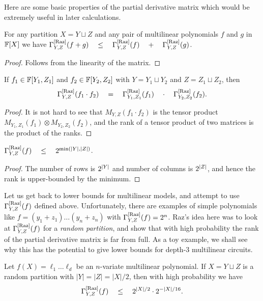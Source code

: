 Here are some basic properties of the partial derivative matrix which would be extremely useful in later calculations.

\begin{observation}\label{obs:pdm-subadditivity}
	For any partition $X = Y \sqcup Z$ and any pair of multilinear 
	polynomials $f$ and $g$ in $\mathbb{F}[X]$ we have 
$\Gamma^{\mathrm{[Raz]}}_{Y,Z}(f+g) \quad \leq \quad \Gamma^{\mathrm{[Raz]}}_{Y,Z}(f) \quad + \quad \Gamma^{\mathrm{[Raz]}}_{Y,Z}(g)$.
\end{observation}
\begin{proof}
Follows from the linearity of the matrix. 
\end{proof}

\begin{observation}[Multiplicativity]\label{obs:pdm-multiplicativity}
If $f_1 \in \mathbb{F}[Y_1,Z_1]$ and $f_2 \in \mathbb{F}[Y_2, Z_2]$ with $Y = Y_1 \sqcup Y_2$ and $Z = Z_1 \sqcup Z_2$, then
$$
\Gamma^{\mathrm{[Raz]}}_{Y,Z}(f_1\cdot f_2) \quad = \quad \Gamma^{\mathrm{[Raz]}}_{Y_1, Z_1}(f_1) \quad \cdot \quad \Gamma^{\mathrm{[Raz]}}_{Y_2, Z_2}(f_2).
$$
\end{observation}
\begin{proof}
  It is not hard to see that $M_{Y,Z}(f_1\cdot f_2)$ is the tensor product $M_{Y_1, Z_1}(f_1) \otimes M_{Y_2, Z_2}(f_2)$, and the rank of a tensor product of two matrices is the product of the ranks.
\end{proof}

\begin{observation}\label{obs:pdm-upperbound}
  $\Gamma^{\mathrm{[Raz]}}_{Y,Z}(f) \quad \leq \quad 2^{\min(\left|Y\right|, \left|Z\right|)}$.
\end{observation}
\begin{proof}
  The number of rows is $2^{\left|Y\right|}$ and number of columns is $2^{\left|Z\right|}$, and hence the rank is upper-bounded by the minimum.
\end{proof}


Let us get back to lower bounds for multilinear models, and attempt to use $\Gamma^{\mathrm{[Raz]}}_{Y,Z}(f)$ defined above. 
Unfortunately, there are examples of simple polynomials like $f = (y_1 + z_1)\dots (y_n + z_n)$ with $\Gamma^{\mathrm{[Raz]}}_{Y,Z}(f) = 2^n$. 
Raz's idea here was to look at $\Gamma^{\mathrm{[Raz]}}_{Y,Z}(f)$ for a \emph{random partition}, and show that with high probability the rank of the partial derivative matrix is far from full. 
As a toy example, we shall see why this has the potential to give lower bounds for depth-$3$ multilinear circuits. 

\begin{lemma}\label{lem:raz-depth-three}
Let $f(X) = \ell_1 \dots \ell_d$ be an $n$-variate multilinear polynomial. 
If $X = Y\sqcup Z$ is a random partition with $|Y| = |Z| = |X|/2$, then with high probability we have
$$
\Gamma^{\mathrm{[Raz]}}_{Y,Z}(f) \quad \leq \quad 2^{|X|/2} \cdot 2^{-|X|/16}.
$$
\end{lemma}


